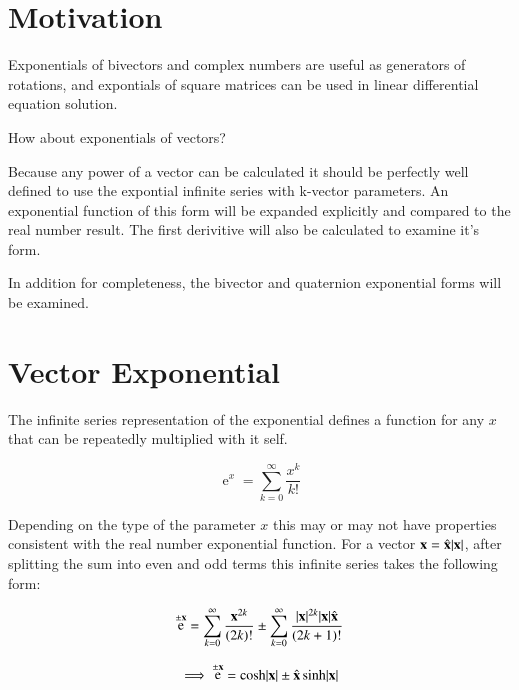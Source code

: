 \documentclass{article}      %
\title{} %
\author{Peeter Joot}         %
\DeclareMathOperator{\Exp}{e}
\begin{document}

\maketitle{}

\section{ Motivation }

Exponentials of bivectors and complex numbers are useful as generators of rotations, and expontials of
square matrices can be used in linear differential equation solution.

How about exponentials of vectors?

Because any power of a vector can be calculated it should be perfectly well defined to use the expontial infinite series with k-vector parameters.  An 
exponential function of this form will be expanded explicitly and compared to the real number result.  The first
derivitive will also be calculated to examine it's form.

In addition for completeness, the bivector and quaternion exponential forms will be examined.

\section{ Vector Exponential }

The infinite series representation of the exponential defines a function for any $x$ that can be repeatedly multiplied
with it self.

\begin{equation}
\Exp^x = \sum_{k=0}^{\infty} \frac{x^k}{k!}
\end{equation}

Depending on the type of the parameter $x$ this may or may not have properties consistent with
the real number exponential function.
For a vector $\mathbf{x} = \hat{\mathbf{x}}\lvert{\mathbf{x}}\rvert$, after splitting the sum into even and odd terms this infinite series takes the
following form:

\begin{equation*}
\Exp^{\pm\Bx}
= 
\sum_{k=0}^{\infty} \frac{\Bx^{2k}}{(2k)!}
\pm
\sum_{k=0}^{\infty} \frac{\abs{\Bx}^{2k}\abs{\Bx}\xcap}{(2k+1)!} 
\end{equation*}

\begin{equation}
\implies
\Exp^{\pm\Bx}
= 
\cosh\abs{\Bx}
\pm
\xcap \sinh\abs{\Bx}
\end{equation}
\end{document}
